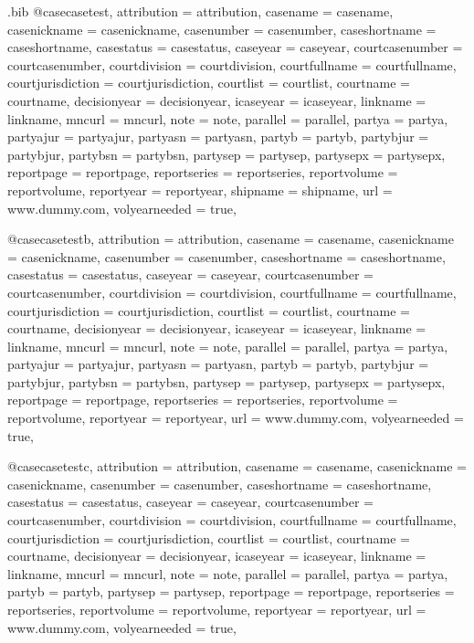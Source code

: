 \begin{filecontents*}[overwrite]{\jobname.bib}
@case{casetest,
attribution = {attribution},
casename = {casename},
casenickname = {casenickname},
casenumber = {casenumber},
caseshortname = {caseshortname},
casestatus = {casestatus},
caseyear = {caseyear},
courtcasenumber = {courtcasenumber},
courtdivision = {courtdivision},
courtfullname = {courtfullname},
courtjurisdiction = {courtjurisdiction},
courtlist = {courtlist},
courtname = {courtname},
decisionyear = {decisionyear},
icaseyear = {icaseyear},
linkname = {linkname},
mncurl = {mncurl},
note = {note},
parallel = {parallel},
partya = {partya},
partyajur = {partyajur},
partyasn = {partyasn},
partyb = {partyb},
partybjur = {partybjur},
partybsn = {partybsn},
partysep = {partysep},
partysepx = {partysepx},
reportpage = {reportpage},
reportseries = {reportseries},
reportvolume = {reportvolume},
reportyear = {reportyear},
shipname = {shipname},
url = {www.dummy.com},
volyearneeded = {true},
}

@case{casetestb,
attribution = {attribution},
casename = {casename},
casenickname = {casenickname},
casenumber = {casenumber},
caseshortname = {caseshortname},
casestatus = {casestatus},
caseyear = {caseyear},
courtcasenumber = {courtcasenumber},
courtdivision = {courtdivision},
courtfullname = {courtfullname},
courtjurisdiction = {courtjurisdiction},
courtlist = {courtlist},
courtname = {courtname},
decisionyear = {decisionyear},
icaseyear = {icaseyear},
linkname = {linkname},
mncurl = {mncurl},
note = {note},
parallel = {parallel},
partya = {partya},
partyajur = {partyajur},
partyasn = {partyasn},
partyb = {partyb},
partybjur = {partybjur},
partybsn = {partybsn},
partysep = {partysep},
partysepx = {partysepx},
reportpage = {reportpage},
reportseries = {reportseries},
reportvolume = {reportvolume},
reportyear = {reportyear},
url = {www.dummy.com},
volyearneeded = {true},
}

@case{casetestc,
attribution = {attribution},
casename = {casename},
casenickname = {casenickname},
casenumber = {casenumber},
caseshortname = {caseshortname},
casestatus = {casestatus},
caseyear = {caseyear},
courtcasenumber = {courtcasenumber},
courtdivision = {courtdivision},
courtfullname = {courtfullname},
courtjurisdiction = {courtjurisdiction},
courtlist = {courtlist},
courtname = {courtname},
decisionyear = {decisionyear},
icaseyear = {icaseyear},
linkname = {linkname},
mncurl = {mncurl},
note = {note},
parallel = {parallel},
partya = {partya},
partyb = {partyb},
partysep = {partysep},
reportpage = {reportpage},
reportseries = {reportseries},
reportvolume = {reportvolume},
reportyear = {reportyear},
url = {www.dummy.com},
volyearneeded = {true},
}


\end{filecontents*}
